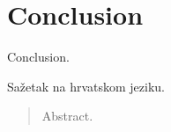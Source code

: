 \documentclass[times, utf8, diplomski]{fer}
\begin{document}
\chapter{Conclusion}
Conclusion.




















\begin{sazetak}
Sažetak na hrvatskom jeziku.

\end{sazetak}

\begin{abstract}
Abstract.

\end{abstract}
\end{document}
